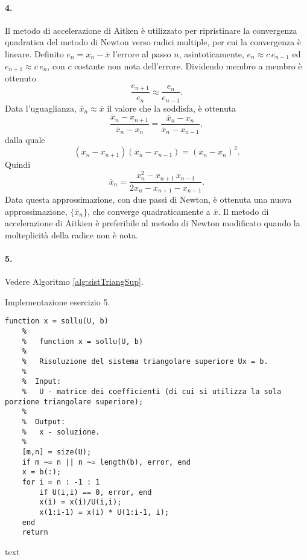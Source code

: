 \paragraph{4.}
Il metodo di accelerazione di Aitken è utilizzato per ripristinare la convergenza quadratica del metodo di Newton verso radici multiple, per cui la convergenza è lineare. Definito $e_n=x_n-\overline{x}$ l'errore al passo $n$, asintoticamente, $e_n\approx c \, e_{n-1}$ ed $e_{n+1}\approx c\, e_n$, con $c$ costante non nota dell'errore. Dividendo membro a membro è ottenuto
\begin{equation*}
    \frac{e_{n+1}}{e_n}\approx\frac{e_n}{e_{n-1}}.
\end{equation*}
Data  l'uguaglianza, $\overline x_n\approx \overline x$ il valore che la soddisfa, è ottenuta
\begin{equation*}
    \frac{\overline x_n - x_{n+1}}{\overline x_n - x_n} =\frac{\overline x_n - x_n}{\overline x_n - x_{n-1}},
\end{equation*}
dalla quale 
\begin{equation*}
    (\overline x_n-x_{n+1})(\overline x_n - x_{n-1})=(\overline x_n - x_n)^2.
\end{equation*}
Quindi
\begin{equation*}
    \overline x_n = \frac{x^2_n-x_{n+1}\,x_{n-1}}{2x_n - x_{n+1} - x_{n-1}}.
\end{equation*}
Data questa approssimazione, con due passi di Newton, è ottenuta una nuova approssimazione, $\{\overline x_n\}$, che converge quadraticamente a $\overline x$. Il metodo di accelerazione di Aitkien è preferibile al metodo di Newton modificato quando la molteplicità della radice non è nota.

\paragraph{5.} Vedere Algoritmo \ref{alg:sistTriangSup}.

\begin{algorithm}
\caption{Implementazione esercizio 5.}\label{alg:sistTriangSup}
    \begin{lstlisting}[style=Matlab-editor]
    function x = sollu(U, b)
    %   
    %   function x = sollu(U, b)
    %
    %   Risoluzione del sistema triangolare superiore Ux = b.
    %
    %  Input:
    %   U - matrice dei coefficienti (di cui si utilizza la sola porzione triangolare superiore);
    %
    %  Output:
    %   x - soluzione.
    %
    [m,n] = size(U);
    if m ~= n || n ~= length(b), error, end
    x = b(:);
    for i = n : -1 : 1
        if U(i,i) == 0, error, end
        x(i) = x(i)/U(i,i);
        x(1:i-1) = x(i) * U(1:i-1, i);
    end
    return
    \end{lstlisting}
\end{algorithm}
text
